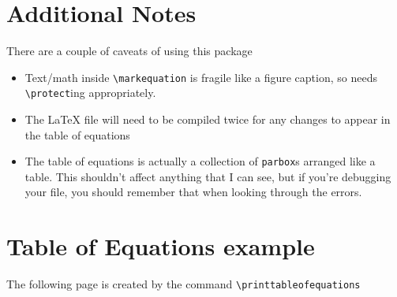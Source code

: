 \documentclass{article}
\begin{document}
\section{Additional Notes}
\label{sec:additional-notes}

There are a couple of caveats of using this package
\begin{itemize}
\item Text/math inside \verb=\markequation= is fragile like a figure caption, so needs \verb=\protect=ing appropriately.
\item The LaTeX file will need to be compiled twice for any changes to appear in the table of equations
\item The table of equations is actually a collection of \verb=parbox=s arranged like a table. This shouldn't affect anything that I can see, but if you're debugging your file, you should remember that when looking through the errors.
\end{itemize}

\appendix

\section{Table of Equations example}
\label{sec:table-equat-example}
The following page is created by the command \verb=\printtableofequations=
\printtableofequations
\end{document}
